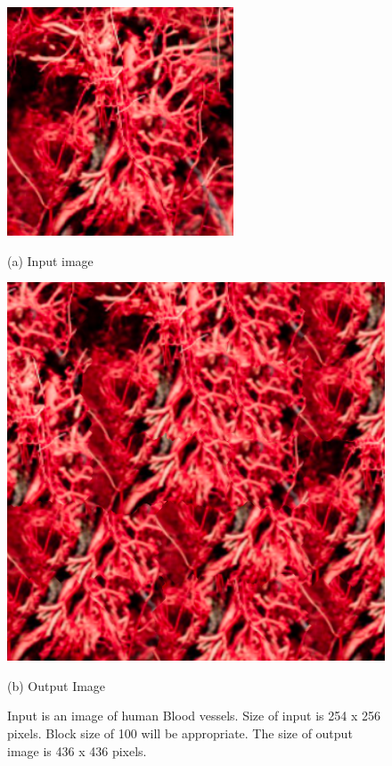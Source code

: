 \documentclass[12pt,a4paper]{report}
\begin{document}
\begin{figure}[H]
  \centering
  \centering
  \includegraphics[scale=0.45]{pics/blood_vessels.png}
  \caption{(a) Input image}
  \label{fig:blood_vessels}
  \endminipage
  \centering
  \includegraphics[scale=0.5]{pics/blood_vessels_100_5.png}
    \caption{(b) Output Image}
  \endminipage
  \caption*{Input is an image of human Blood vessels. Size of input is 254 x 256 pixels. Block size of 100 will be appropriate. The size of output image is 436 x 436 pixels.}
  
\end{figure}
\end{document}
